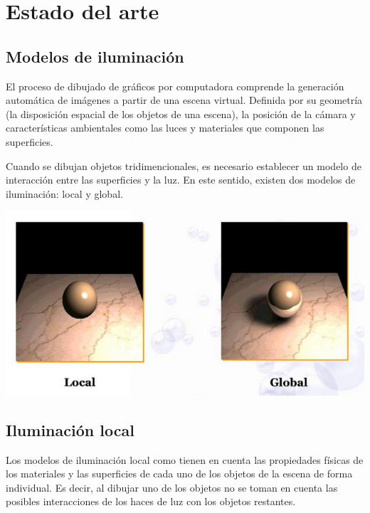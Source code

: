 \chapter{Estado del arte}
\label{ch:chap02}

\section{Modelos de iluminación}
\label{sec:dibujado}

El proceso de dibujado de gráficos por computadora comprende la generación automática de imágenes a partir de una escena virtual.
Definida por su geometría (la disposición espacial de los objetos de una escena), la posición de la cámara y características ambientales 
como las luces y materiales que componen las superficies.

Cuando se dibujan objetos tridimencionales, es necesario establecer un modelo de interacción entre las superficies y
la luz. En este sentido, existen dos modelos de iluminación: local y global.

\begin{minipage}[h]{0.8\linewidth}
    \includegraphics[width=\linewidth]{assets/local_vs_global}
    \label{local-vs-global-img}
\end{minipage}

\section{Iluminación local}
\label{sec:ilumlocal}
Los modelos de iluminación local como\cite{Phong} tienen en cuenta las propiedades físicas de los materiales
y las superficies de cada uno de los objetos de la escena de forma individual. Es decir, al dibujar uno de los
objetos no se toman en cuenta las posibles interacciones de los haces de luz con los objetos restantes.

